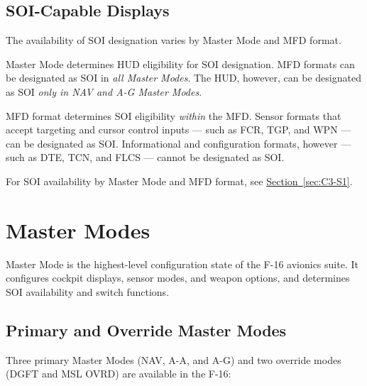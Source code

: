\documentclass[11pt, a4paper, twoside]{report}
\newcommand{\secref}[1]{\hyperref[#1]{Section~\ref*{#1}}}
\begin{document}
\subsection{SOI-Capable Displays}
\label{sec:C2-S1-S3}

The availability of SOI designation varies by Master Mode and MFD format.

Master Mode determines HUD eligibility for SOI designation. MFD formats can be designated as SOI in \textit{all Master Modes}. The HUD, however, can be designated as SOI \textit{only in NAV and A-G Master Modes}.

MFD format determines SOI eligibility \textit{within} the MFD. Sensor formats that accept targeting and cursor control inputs --- such as FCR, TGP, and WPN --- can be designated as SOI. Informational and configuration formats, however --- such as DTE, TCN, and FLCS --- cannot be designated as SOI.

For SOI availability by Master Mode and MFD format, see \secref{sec:C3-S1}.

\section{Master Modes}
\label{sec:C2-S2}

Master Mode is the highest-level configuration state of the F-16 avionics suite. It configures cockpit displays, sensor modes, and weapon options, and determines SOI availability and switch functions.

\subsection{Primary and Override Master Modes}
\label{sec:C2-S2-S1}

Three primary Master Modes (NAV, A-A, and A-G) and two override modes (DGFT and MSL OVRD) are available in the F-16:
\end{document}
